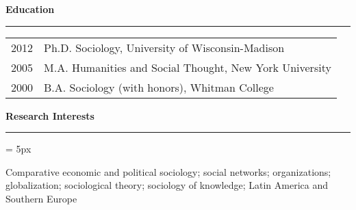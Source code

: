 \documentclass[12pt,letterpaper]{article}
\renewcommand{\labelitemi}{$$}
\newcommand{\sectionhead}[1]{\begin{flushleft}\large\bf{#1}\vspace{.1cm}\hrule\end{flushleft}}
\begin{document}
\sectionhead{Education} 
\begin{tabulary}{.97\textwidth}{@{}p{2.5cm}  L}

2012 & Ph.D. Sociology, University of Wisconsin-Madison\vspace{0.2cm} \\


2005 & M.A. Humanities and Social Thought, New York University\vspace{0.2cm}\\


2000 & B.A. Sociology (with honors), Whitman College \\
\end{tabulary}

\sectionhead{Research Interests}
\begin{list}{\labelitemi}{\leftmargin = 5px}
	\item Comparative economic and political sociology; social networks; organizations; globalization; sociological theory; sociology of knowledge; Latin America and Southern Europe
\end{list}

\end{document}
